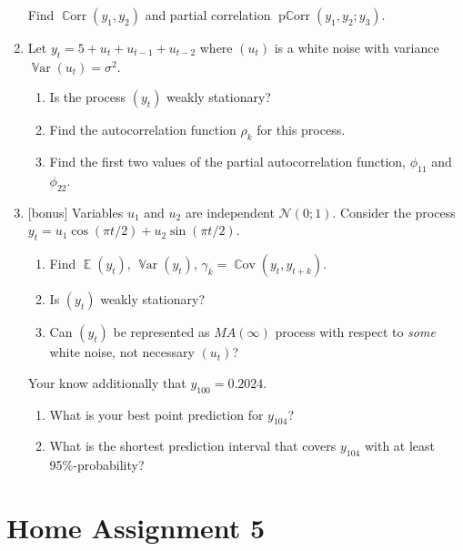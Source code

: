 \documentclass[12pt]{article}
\DeclareMathOperator{\Cov}{\mathbb{C}ov}
\DeclareMathOperator{\Corr}{\mathbb{C}orr}
\DeclareMathOperator{\Var}{\mathbb{V}ar}
\DeclareMathOperator{\E}{\mathbb{E}}
\DeclareMathOperator{\pCorr}{\mathrm{p}\mathbb{C}\mathrm{orr}}
\newcommand \cN{\mathcal{N}}
\begin{document}
\begin{enumerate}
  Find $\Corr(y_1, y_2)$ and partial correlation $\pCorr(y_1, y_2 ; y_3)$.

  \item Let $y_t = 5 + u_t + u_{t-1} + u_{t-2}$ where $(u_t)$ is a white noise with variance $\Var(u_t) = \sigma^2$.
  \begin{enumerate}
    \item Is the process $(y_t)$ weakly stationary?
    \item Find the autocorrelation function $\rho_k$ for this process. 
    \item Find the first two values of the partial autocorrelation function, $\phi_{11}$ and $\phi_{22}$.
  \end{enumerate}

  \item {[bonus]} Variables $u_1$ and $u_2$ are independent $\cN(0;1)$. 
  Consider the process $y_t = u_1 \cos (\pi t /2) + u_2 \sin (\pi t /2)$.

  \begin{enumerate}
    \item Find $\E(y_t)$, $\Var(y_t)$, $\gamma_k = \Cov(y_t, y_{t+k})$. 
    \item Is $(y_t)$ weakly stationary? 
    \item Can $(y_t)$ be represented as $MA(\infty)$ process with respect to \textit{some} white noise, not necessary $(u_t)$?
  \end{enumerate}

  Your know additionally that $y_{100} = 0.2024$. 
  \begin{enumerate}[resume]
    \item What is your best point prediction for $y_{104}$? 
    \item What is the shortest prediction interval that covers $y_{104}$ with at least 95\%-probability?
  \end{enumerate}


\end{enumerate}

\newpage
\section*{Home Assignment 5}
\end{document}
